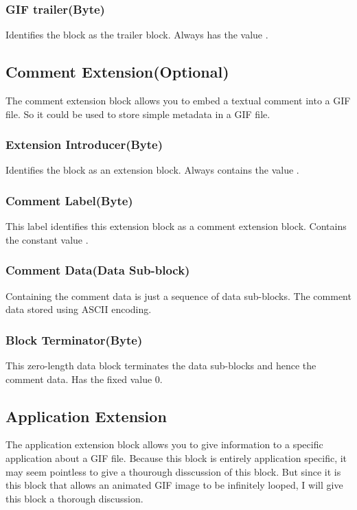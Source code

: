 \subsubsection{GIF trailer(Byte)}

Identifies the block as the trailer block. Always has the value
.

\subsection{Comment Extension(Optional)}

The comment extension block allows you to embed a textual comment into
a GIF file. So it could be used to store simple metadata in a GIF file.

\subsubsection{Extension Introducer(Byte)}

Identifies the block as an extension block. Always contains the
value .

\subsubsection{Comment Label(Byte)}

This label identifies this extension block as a comment extension
block. Contains the constant value .

\subsubsection{Comment Data(Data Sub-block)}

Containing the comment data is just a sequence of data sub-blocks. The
comment data stored using ASCII encoding.

\subsubsection{Block Terminator(Byte)}

This zero-length data block terminates the data sub-blocks and hence
the comment data. Has the fixed value $0$.

\subsection{Application Extension}

The application extension block allows you to give information to a
specific application about a GIF file. Because this block is
entirely application specific, it may seem pointless to give a
thourough disscussion of this block. But since it is this block that
allows an animated GIF image to be infinitely looped, I will give this
block a thorough discussion.

